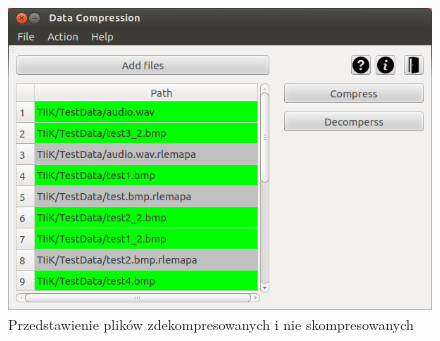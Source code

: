 \documentclass[12pt,a4paper,notitlepage]{report}
\begin{document}
\begin{figure}[H]
	\centering
	\includegraphics[scale=.7]{all}
	\caption{Przedstawienie plików zdekompresowanych i nie skompresowanych}
\end{figure}
\end{document}
